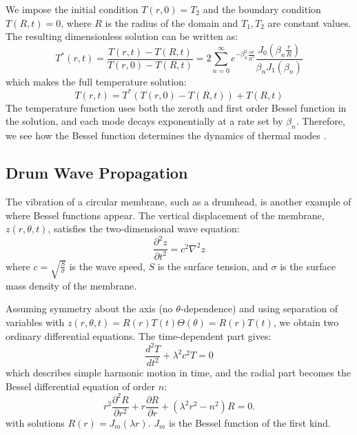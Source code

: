 \documentclass[linenumbers, twocolumn]{aastex631}
\begin{document}
\noindent We impose the initial condition $T(r,0)=T_2$ and the boundary condition
$T(R,t)=0$, where $R$ is the radius of the domain and $T_1,T_2$ are constant
values. The resulting dimensionless solution can be written as:
\begin{equation}
    T^*(r,t)=\frac{T(r,t)-T(R,t)}{T(r,0)-T(R,t)}=2\sum_{n=0}^\infty e^{-\beta_n^2\frac{\alpha t}{R^2}}\frac{J_0(\beta_n\frac{r}{R})}{\beta_nJ_1(\beta_n)}
\end{equation}
\noindent which makes the full temperature solution:
\begin{equation}
    T(r,t)=T^*(T(r,0)-T(R,t))+T(R,t)
\end{equation}
\noindent The temperature function uses both the zeroth and first order
Bessel function in the solution, and each mode decays exponentially at a rate set 
by $\beta_n$. Therefore, we see how the Bessel function determines the 
dynamics of thermal modes \cite{neils}.\\


\subsection{Drum Wave Propagation}

The vibration of a circular membrane, such as a drumhead, is another example of
where Bessel functions appear. The vertical displacement of the membrane, $z(r,\theta,t)$,
satisfies the two-dimensional wave equation:
\begin{equation}
    \frac{\partial^2z}{\partial t^2}=c^2\nabla^2z
\end{equation}
\noindent where $c=\sqrt{\frac{S}{\sigma}}$ is the wave speed, $S$ is the surface
tension, and $\sigma$ is the surface mass density of the membrane. 

\noindent Assuming symmetry about the axis (no $\theta$-dependence) and using
separation of variables with $z(r,\theta,t)=R(r)T(t)\Theta(\theta)=R(r)T(t)$,
we obtain two ordinary differential equations. The time-dependent part gives:
\begin{equation}
    \frac{d^2T}{dt^2}+\lambda^2c^2T=0
\end{equation}
\noindent which describes simple harmonic motion in time, and the radial part
 becomes the Bessel differential equation of order $n$:
\begin{equation}
    r^2\frac{\partial^2R}{\partial r^2}+r\frac{\partial R}{\partial r}+(\lambda^2r^2-n^2)R=0.
\end{equation}
\noindent with solutions $R(r)=J_m(\lambda r)$. $J_m$ is the Bessel
function of the first kind.
\end{document}
